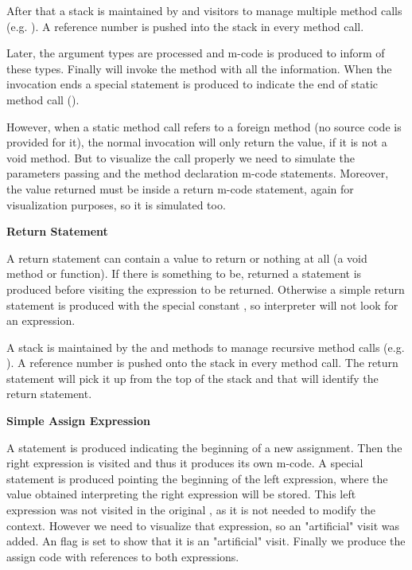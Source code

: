 After that a stack is maintained by  and
 visitors to manage multiple method calls (e.g.
). A reference number is pushed into the
stack in every method call.

Later, the argument types are processed and m-code is produced to
inform  of these types. Finally \djava{}
will invoke the method with all the information. When the
invocation ends a special statement is produced to indicate the
end of static method call ().

However, when a static method call refers to a foreign method
(no source code is provided for it), the normal invocation will only
return the value, if it is not a void method. But to visualize the
call properly we need to simulate the parameters passing and the
method declaration m-code statements. Moreover, the value returned
must be inside a return m-code statement, again for visualization
purposes, so it is simulated too.

{\bf{Return Statement}}

A return statement can contain a value to return or nothing at all
(a void method or function). If there is something to be, returned
a  statement is produced before visiting the expression
to be returned. Otherwise a simple return statement is produced
with the special constant , so \jel{}
interpreter will not look for an expression.

A stack is maintained by the  and
 methods to manage recursive method calls (e.g.
). A reference number is pushed onto the
stack in every method call. The return statement will pick it up
from the top of the stack and that will identify the return
statement.

{\bf{Simple Assign Expression}}

A  statement is produced indicating the beginning of a
new assignment. Then the right expression is visited and thus it
produces its own m-code. A special statement  is produced
pointing the beginning of the left expression, where the value
obtained interpreting the right expression will be stored. This
left expression was not visited in the original \djava{}, as
it is not needed to modify the context. However we need to visualize
that expression, so an "artificial" visit was added. An 
flag is set to show that it is an "artificial" visit. Finally we
produce the assign code with references to both expressions.

